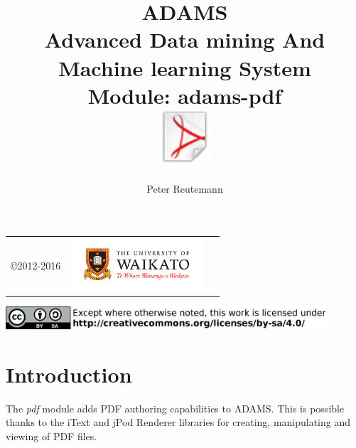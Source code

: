 \documentclass[a4paper]{book}
\title{
  \textbf{ADAMS} \\
  {\Large \textbf{A}dvanced \textbf{D}ata mining \textbf{A}nd \textbf{M}achine
  learning \textbf{S}ystem} \\
  {\Large Module: adams-pdf} \\
  \vspace{1cm}
  \includegraphics[width=2cm]{images/pdf-module.png} \\
}
\author{
  Peter Reutemann
}
\begin{document}
\begin{titlepage}
\maketitle

\thispagestyle{empty}
\center
\begin{table}[b]
	\begin{tabular}{c l l}
		\parbox[c][2cm]{2cm}{\copyright 2012-2016} &
		\parbox[c][2cm]{5cm}{\includegraphics[width=5cm]{images/coat_of_arms.pdf}} \\
	\end{tabular}
	\includegraphics[width=12cm]{images/cc.png} \\
\end{table}

\end{titlepage}

\tableofcontents
\listoffigures

\chapter{Introduction}
The \textit{pdf} module adds PDF authoring capabilities to ADAMS. 
This is possible thanks to the iText \cite{itext} and jPod Renderer \cite{jpod} 
libraries for creating, manipulating and viewing of PDF files.

\end{document}
